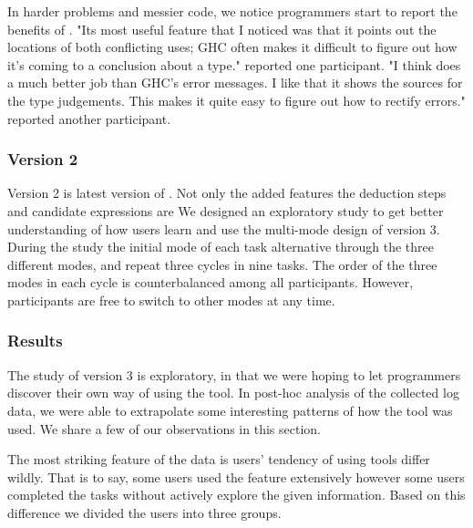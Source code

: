 In harder problems and messier code, we notice programmers start to report the benefits of \chameleon{}. "Its most useful feature that I noticed was that it points out the locations of both conflicting uses; GHC often makes it difficult to figure out how it's coming to a conclusion about a type." reported one participant. "I think \chameleon{}  does a much better job than GHC's error messages. I like that it shows the sources for the type judgements. This makes it quite easy to figure out how to rectify errors." reported another participant.



\subsubsection{\textbf{Version 2}}  \label{sub:us4}

Version 2 is latest version of \chameleon{}. Not only the added features the deduction steps and candidate expressions are We designed an exploratory study to get better understanding of how users learn and use the multi-mode design of \chameleon{} version 3. During the study the initial mode of each task alternative through the three different modes, and repeat three cycles in nine tasks. The order of the three modes in each cycle is counterbalanced among all participants. However, participants are free to switch to other modes at any time. 



\subsubsection*{\textbf{Results}} 

The study of version 3 \chameleon{} is exploratory, in that we were hoping to let programmers discover their own way of using the tool. In post-hoc analysis of the collected log data, we were able to extrapolate some interesting patterns of how the tool was used. We share a few of our observations in this section.


The most striking feature of the data is users' tendency of using tools differ wildly. That is to say, some users used the feature extensively however some users completed the tasks without actively explore the given information. Based on this difference we divided the users into three groups.

